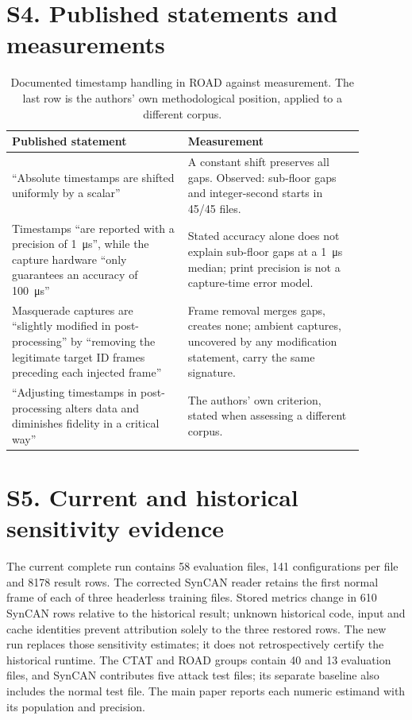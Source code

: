 \documentclass[journal,onecolumn]{IEEEtran}
\begin{document}
\section*{S4. Published statements and measurements}
\begin{table}[H]
\centering
\caption{Documented timestamp handling in ROAD against measurement. The last row is the
authors' own methodological position, applied to a different corpus.}
\label{tab:official}
\begin{tabular}{>{\raggedright\arraybackslash}p{0.44\linewidth}>{\raggedright\arraybackslash}p{0.44\linewidth}}
\toprule
Published statement & Measurement \\
\midrule
``Absolute timestamps are shifted uniformly by a scalar'' \citep{road,roadzenodo} &
A constant shift preserves all gaps. Observed: sub-floor gaps and integer-second starts in 45/45 files. \\
\addlinespace
Timestamps ``are reported with a precision of \SI{1}{\micro\second}'', while the capture
hardware ``only guarantees an accuracy of \SI{100}{\micro\second}'' \citep{road,roadzenodo} &
Stated accuracy alone does not explain sub-floor gaps at a \SI{1}{\micro\second} median; print precision is not a capture-time error model. \\
\addlinespace
Masquerade captures are ``slightly modified in post-processing'' by ``removing the
legitimate target ID frames preceding each injected frame'' \citep{road} &
Frame removal merges gaps, creates none; ambient captures, uncovered by any modification statement, carry the same signature. \\
\addlinespace
``Adjusting timestamps in post-processing alters data and diminishes fidelity in a
critical way'' \citep{road} &
The authors' own criterion, stated when assessing a different corpus. \\
\bottomrule
\end{tabular}
\end{table}
\clearpage
\section*{S5. Current and historical sensitivity evidence}
The current complete run contains 58 evaluation files, 141 configurations per file and
8178 result rows. The corrected SynCAN reader retains the first normal frame of each
of three headerless training files. Stored metrics change in 610 SynCAN rows relative
to the historical result; unknown historical code, input and cache identities prevent
attribution solely to the three restored rows. The new run replaces those sensitivity
estimates; it does not retrospectively certify the historical runtime. The CTAT and ROAD
groups contain 40 and 13 evaluation files, and SynCAN contributes five attack test files;
its separate baseline also includes the normal test file. The main paper reports each
numeric estimand with its population and precision.


\end{document}
